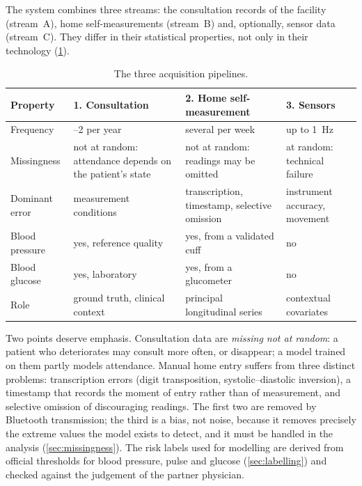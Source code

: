 The system combines three streams: the consultation records of the facility (stream~A), home self-measurements (stream~B) and, optionally, sensor data (stream~C). They differ in their statistical properties, not only in their technology (\cref{tab:pipelines}).

\begin{table}[htbp]
\centering\footnotesize
\caption{The three acquisition pipelines.}\label{tab:pipelines}
\begin{tabularx}{\textwidth}{@{}>{\raggedright\arraybackslash}p{2.9cm} >{\raggedright\arraybackslash}X >{\raggedright\arraybackslash}X >{\raggedright\arraybackslash}X@{}}
\toprule
\textbf{Property} & \textbf{1. Consultation} & \textbf{2. Home self-measurement} & \textbf{3. Sensors} \\
\midrule
Frequency & 1--2 per year & several per week & up to 1~Hz \\
Missingness & not at random: attendance depends on the patient's state & not at random: readings may be omitted & at random: technical failure \\
Dominant error & measurement conditions & transcription, timestamp, selective omission & instrument accuracy, movement \\
Blood pressure & yes, reference quality & yes, from a validated cuff & no \\
Blood glucose & yes, laboratory & yes, from a glucometer & no \\
Role & ground truth, clinical context & principal longitudinal series & contextual covariates \\
\bottomrule
\end{tabularx}
\end{table}

Two points deserve emphasis. Consultation data are \emph{missing not at random}: a patient who deteriorates may consult more often, or disappear; a model trained on them partly models attendance. Manual home entry suffers from three distinct problems: transcription errors (digit transposition, systolic--diastolic inversion), a timestamp that records the moment of entry rather than of measurement, and selective omission of discouraging readings. The first two are removed by Bluetooth transmission; the third is a bias, not noise, because it removes precisely the extreme values the model exists to detect, and it must be handled in the analysis (\cref{sec:missingness}). The risk labels used for modelling are derived from official thresholds for blood pressure, pulse and glucose (\cref{sec:labelling}) and checked against the judgement of the partner physician.

